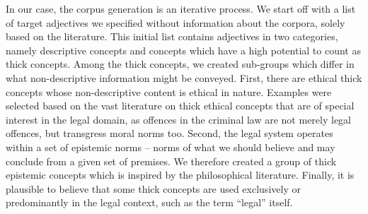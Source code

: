 \documentclass{article}
\begin{document}
In our case, the corpus generation is an iterative process. We start off with a list of target adjectives we specified without information about the corpora, solely based on the literature. This initial list contains adjectives in two categories, namely descriptive concepts and concepts which have a high potential to count as thick concepts. Among the thick concepts, we created sub-groups which differ in what non-descriptive information might be conveyed. First, there are ethical thick concepts whose non-descriptive content is ethical in nature. Examples were selected based on the vast literature on thick ethical concepts that are of special interest in the legal domain, as offences in the criminal law are not merely legal offences, but transgress moral norms too. Second, the legal system operates within a set of epistemic norms -- norms of what we should believe and may conclude from a given set of premises. We therefore created a group of thick epistemic concepts which is inspired by the philosophical literature. Finally, it is plausible to believe that some thick concepts are used exclusively or predominantly in the legal context, such as the term \enquote{legal} itself. 
\end{document}
